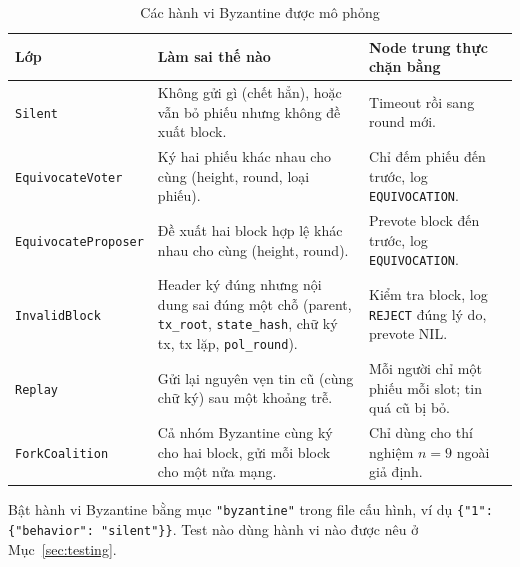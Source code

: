 \begin{table}[H]
\centering
\small
\begin{tabularx}{\textwidth}{|p{3.5cm}|X|p{3.6cm}|}
\hline
\textbf{Lớp} & \textbf{Làm sai thế nào} & \textbf{Node trung thực chặn bằng} \\
\hline
\texttt{Silent} & Không gửi gì (chết hẳn), hoặc vẫn bỏ phiếu nhưng không đề xuất block. & Timeout rồi sang round mới. \\
\hline
\texttt{EquivocateVoter} & Ký hai phiếu khác nhau cho cùng (height, round, loại phiếu). & Chỉ đếm phiếu đến trước, log \texttt{EQUIVOCATION}. \\
\hline
\texttt{EquivocateProposer} & Đề xuất hai block hợp lệ khác nhau cho cùng (height, round). & Prevote block đến trước, log \texttt{EQUIVOCATION}. \\
\hline
\texttt{InvalidBlock} & Header ký đúng nhưng nội dung sai đúng một chỗ (parent, \texttt{tx\_root}, \texttt{state\_hash}, chữ ký tx, tx lặp, \texttt{pol\_round}). & Kiểm tra block, log \texttt{REJECT} đúng lý do, prevote NIL. \\
\hline
\texttt{Replay} & Gửi lại nguyên vẹn tin cũ (cùng chữ ký) sau một khoảng trễ. & Mỗi người chỉ một phiếu mỗi slot; tin quá cũ bị bỏ. \\
\hline
\texttt{ForkCoalition} & Cả nhóm Byzantine cùng ký cho hai block, gửi mỗi block cho một nửa mạng. & Chỉ dùng cho thí nghiệm $n=9$ ngoài giả định. \\
\hline
\end{tabularx}
\caption{Các hành vi Byzantine được mô phỏng}
\label{tab:byzantine}
\end{table}

Bật hành vi Byzantine bằng mục \texttt{"byzantine"} trong file cấu hình, ví dụ \texttt{\{"1": \{"behavior": "silent"\}\}}. Test nào dùng hành vi nào được nêu ở Mục~\ref{sec:testing}.
